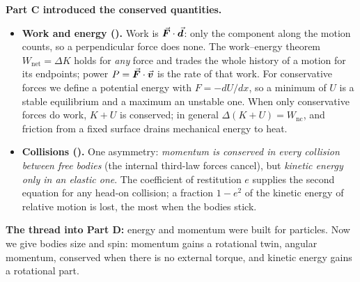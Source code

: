 \textbf{Part C introduced the conserved quantities.}
\begin{itemize}
\item \textbf{Work and energy ().} Work is $\vec{\bm{F}}\cdot\vec{\bm{d}}$: only the component along the motion
counts, so a perpendicular force does none. The work--energy theorem $W_{\text{net}}=\Delta K$ holds for
\emph{any} force and trades the whole history of a motion for its endpoints; power $P=\vec{\bm{F}}\cdot\vec{\bm{v}}$ is the
rate of that work. For conservative forces we define a potential energy with $F=-dU/dx$, so a minimum of $U$
is a stable equilibrium and a maximum an unstable one. When only conservative forces do work, $K+U$ is
conserved; in general $\Delta(K+U)=W_{\text{nc}}$, and friction from a fixed surface drains mechanical energy
to heat.
\item \textbf{Collisions ().} One asymmetry: \emph{momentum is conserved in every
collision between free bodies} (the internal third-law forces cancel), but \emph{kinetic energy only in
an elastic one}. The coefficient of restitution $e$ supplies the second equation for any head-on
collision; a fraction $1-e^2$ of the kinetic energy of relative motion is lost, the most when the bodies
stick.
\end{itemize}
\textbf{The thread into Part D:} energy and momentum were built for particles. Now we give bodies size and
spin: momentum gains a rotational twin, angular momentum, conserved when there is no external torque, and
kinetic energy gains a rotational part.
